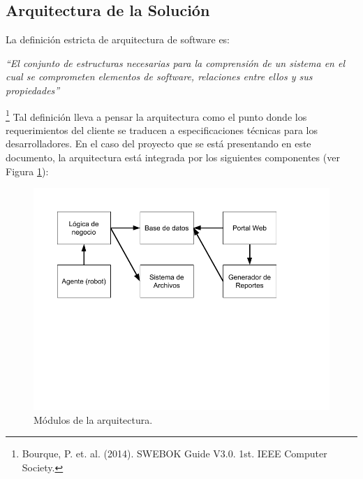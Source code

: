 \documentclass[a4paper,10pt]{article}
\begin{document}
\subsection{Arquitectura de la Solución}
La definición estricta de arquitectura de software es:
\begin{center}\textit{``El conjunto de estructuras necesarias para la comprensión de un sistema en el cual se comprometen elementos de software, relaciones entre ellos y sus propiedades''}\end{center}\footnote{Bourque, P. et. al. (2014). SWEBOK Guide V3.0. 1st. IEEE Computer Society.}
Tal definición lleva a pensar la arquitectura como el punto donde los requerimientos del cliente se traducen a especificaciones técnicas para los desarrolladores. En el caso del proyecto que se está presentando en este documento, la arquitectura está integrada por los siguientes componentes (ver Figura \ref{fig:dia-arq-comp}):
\begin{figure}[h]
\centering
\includegraphics[scale=0.45]{dia-arq-comp} 
\caption{Módulos de la arquitectura.}
\label{fig:dia-arq-comp}
\end{figure}
\end{document}
